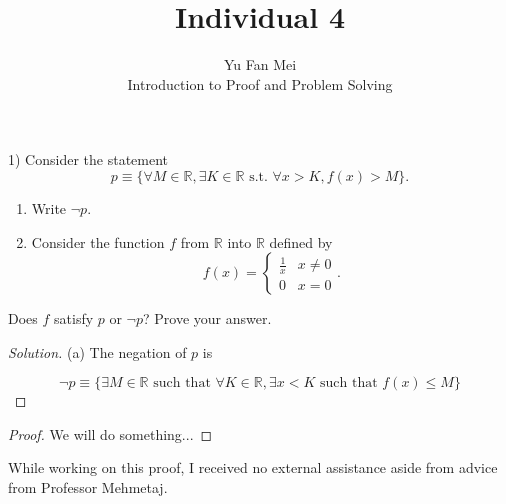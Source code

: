 \documentclass[12pt]{article}
\newenvironment{problem}[2][Problem]{\begin{trivlist}
\item[\hskip \labelsep {\bfseries #1}\hskip \labelsep {\bfseries #2.}]}{\end{trivlist}}
\newenvironment{solution}
               {\let\oldqedsymbol=\qedsymbol
                \renewcommand{\qedsymbol}{$\blacktriangleleft$}
                \begin{proof}[\textit\upshape Solution]}
               {\end{proof}
                \renewcommand{\qedsymbol}{\oldqedsymbol}}
\begin{document}

\title{Individual 4}%
\author{Yu Fan Mei\\ %
	Introduction to Proof and Problem Solving} %

\maketitle

\begin{problem}{12} %
    (1) Consider the statement
    $$p \equiv \{\forall M \in \mathbb{R}, \exists K \in \mathbb{R}\,\, \text{s.t.} \,\,\forall x > K,
    f(x) > M\}.$$
    \begin{enumerate}
    \item[(a)] Write $\neg p$.
    \item[(b)] Consider the function $f$ from $\mathbb{R}$ into $\mathbb{R}$ defined by
    $$f(x) = \begin{cases}
    \frac{1}{x} & x \neq 0\\
    0 & x = 0
    \end{cases}.$$
    \end{enumerate}
    Does $f$ satisfy $p$ or $\neg p$? Prove your answer.
    

\end{problem}

\begin{solution}

    (a) The negation of $p$ is

    $$\lnot p \equiv \{ \exists M \in \mathbb{R} \text{ such that } \forall K \in \mathbb{R}, \exists x < K \text{ such that } f(x) \leq M\}$$
\end{solution}

\begin{proof}
    
    We will do something...



\end{proof}


\noindent While working on this proof, I received no external assistance aside from advice from Professor Mehmetaj.
\end{document}
